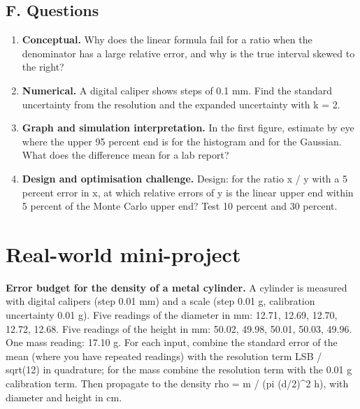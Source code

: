 \documentclass[11pt,a4paper]{article}
\begin{document}
\subsection*{F. Questions}
\begin{enumerate}[nosep]
\item \textbf{Conceptual.} Why does the linear formula fail for a ratio when the denominator has a large relative error, and why is the true interval skewed to the right?
\item \textbf{Numerical.} A digital caliper shows steps of 0.1 mm. Find the standard uncertainty from the resolution and the expanded uncertainty with k = 2.
\item \textbf{Graph and simulation interpretation.} In the first figure, estimate by eye where the upper 95 percent end is for the histogram and for the Gaussian. What does the difference mean for a lab report?
\item \textbf{Design and optimisation challenge.} Design: for the ratio x / y with a 5 percent error in x, at which relative errors of y is the linear upper end within 5 percent of the Monte Carlo upper end? Test 10 percent and 30 percent.
\end{enumerate}

\section{Real-world mini-project}
\textbf{Error budget for the density of a metal cylinder.} A cylinder is measured with digital calipers (step 0.01 mm) and a scale (step 0.01 g, calibration uncertainty 0.01 g). Five readings of the diameter in mm: 12.71, 12.69, 12.70, 12.72, 12.68. Five readings of the height in mm: 50.02, 49.98, 50.01, 50.03, 49.96. One mass reading: 17.10 g. For each input, combine the standard error of the mean (where you have repeated readings) with the resolution term LSB / sqrt(12) in quadrature; for the mass combine the resolution term with the 0.01 g calibration term. Then propagate to the density rho = m / (pi (d/2)\textasciicircum{}2 h), with diameter and height in cm.
\end{document}
